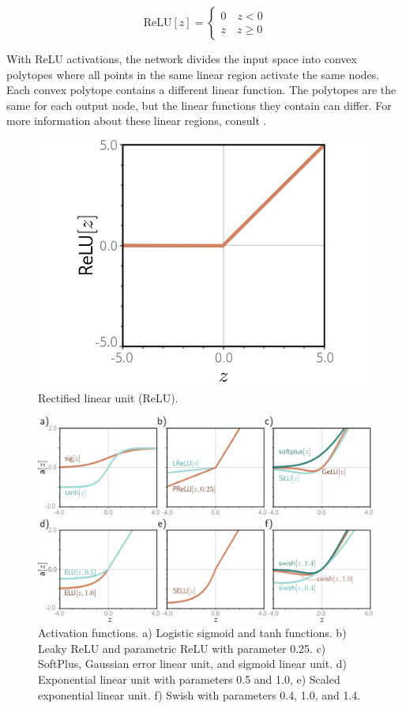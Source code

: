 \begin{equation}
    \text{ReLU}\left[ z\right] =\begin{cases}0 \quad z<0 \\ z \quad z \geq 0\end{cases}
\end{equation}

\noindent With ReLU activations, the network divides the input space into convex polytopes where all points in the same linear region activate the same nodes. Each convex polytope contains a different linear function. The polytopes are the same for each output node, but the linear functions they contain can differ. For more information about these linear regions, consult \cite{zhang2020empirical}.

\begin{figure}[H]
    \centering
    \includegraphics[width=0.7\linewidth]{Images/ShallowReLU.jpg}
    \caption{Rectified linear unit (ReLU).}
    \label{fig:ShallowReLU}
\end{figure}

\begin{figure}[H]
    \centering
    \includegraphics[width=0.95\linewidth]{Images/ShallowActivations.jpg}
    \caption{Activation functions. a) Logistic sigmoid and tanh functions. b) Leaky ReLU and parametric ReLU with parameter 0.25. c) SoftPlus, Gaussian error linear unit, and sigmoid linear unit. d) Exponential linear unit with parameters 0.5 and 1.0, e) Scaled exponential linear unit. f) Swish with parameters 0.4, 1.0, and 1.4.}
    \label{fig:ShallowActivations}
\end{figure}

